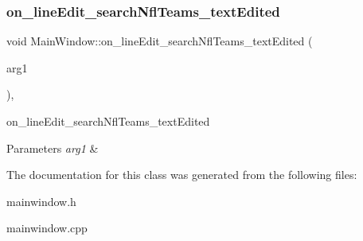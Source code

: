 \subsubsection{\texorpdfstring{on\+\_\+line\+Edit\+\_\+search\+Nfl\+Teams\+\_\+text\+Edited}{on\_lineEdit\_searchNflTeams\_textEdited}}
{\footnotesize\ttfamily void Main\+Window\+::on\+\_\+line\+Edit\+\_\+search\+Nfl\+Teams\+\_\+text\+Edited (\begin{DoxyParamCaption}\item[{const Q\+String \&}]{arg1 }\end{DoxyParamCaption})\hspace{0.3cm}{\ttfamily [private]}, {\ttfamily [slot]}}



on\+\_\+line\+Edit\+\_\+search\+Nfl\+Teams\+\_\+text\+Edited 


\begin{DoxyParams}{Parameters}
{\em arg1} & \\
\hline
\end{DoxyParams}


The documentation for this class was generated from the following files\+:\begin{DoxyCompactItemize}
\item 
mainwindow.\+h\item 
mainwindow.\+cpp\end{DoxyCompactItemize}
